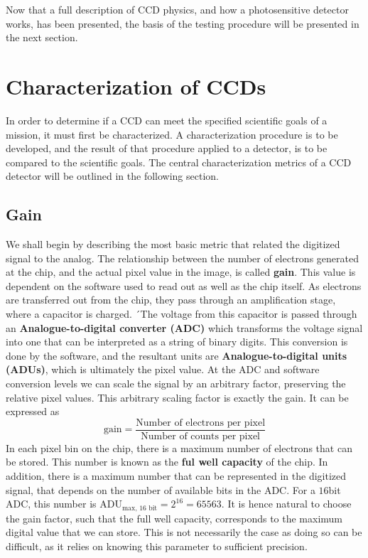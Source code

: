 \documentclass[../main.tex]{subfiles}
\begin{document}
	Now that a full description of CCD physics, and how a photosensitive detector works, has been presented, the basis of the testing procedure will be presented in the next section.
	
	\section{Characterization of CCDs}
	In order to determine if a CCD can meet the specified scientific goals of a mission, it must first be characterized. A characterization procedure is to be developed, and the result of that procedure applied to a detector, is to be compared to the scientific goals. The central characterization metrics of a CCD detector will be outlined in the following section. 
	
	\subsection{Gain}
	We shall begin by describing the most basic metric that related the digitized signal to the analog. The relationship between the number of electrons generated at the chip, and the actual pixel value in the image, is called \textbf{gain}\cite{handbookofccdastronomy}. This value is dependent on the software used to read out as well as the chip itself. As electrons are transferred out from the chip, they pass through an amplification stage, where a capacitor is charged. ´The voltage from this capacitor is passed through an \textbf{Analogue-to-digital converter (ADC)} which transforms the voltage signal into one that can be interpreted as a string of binary digits. This conversion is done by the software, and the resultant units are \textbf{Analogue-to-digital units (ADUs)}, which is ultimately the pixel value. At the ADC and software conversion levels we can scale the signal by an arbitrary factor, preserving the relative pixel values. This arbitrary scaling factor is exactly the gain. It can be expressed as
	\begin{equation}
		\text{gain} = \frac{\text{Number of electrons per pixel}}{\text{Number of counts per pixel}}
	\end{equation} 
	In each pixel bin on the chip, there is a maximum number of electrons that can be stored. This number is known as the \textbf{ful well capacity} of the chip. In addition, there is a maximum number that can be represented in the digitized signal, that depends on the number of available bits in the ADC. For a $16$bit ADC, this number is $\text{ADU}_{\text{max, 16 bit}} = 2^{16} = 65563$. It is hence natural to choose the gain factor, such that the full well capacity, corresponds to the maximum digital value that we can store. This is not necessarily the case as doing so can be difficult, as it relies on knowing this parameter to sufficient precision.
	
\end{document}
